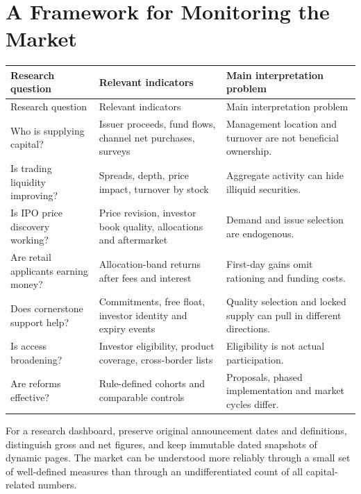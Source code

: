 \documentclass[11pt,a4paper]{article}
\begin{document}
\section{A Framework for Monitoring the Market}
\begin{longtable}{@{}L{3.3cm}L{6.2cm}L{6.0cm}@{}}
\toprule Research question & Relevant indicators & Main interpretation problem\\\midrule\endfirsthead
\toprule Research question & Relevant indicators & Main interpretation problem\\\midrule\endhead
Who is supplying capital? & Issuer proceeds, fund flows, channel net purchases, surveys & Management location and turnover are not beneficial ownership.\\
Is trading liquidity improving? & Spreads, depth, price impact, turnover by stock & Aggregate activity can hide illiquid securities.\\
Is IPO price discovery working? & Price revision, investor book quality, allocations and aftermarket & Demand and issue selection are endogenous.\\
Are retail applicants earning money? & Allocation-band returns after fees and interest & First-day gains omit rationing and funding costs.\\
Does cornerstone support help? & Commitments, free float, investor identity and expiry events & Quality selection and locked supply can pull in different directions.\\
Is access broadening? & Investor eligibility, product coverage, cross-border lists & Eligibility is not actual participation.\\
Are reforms effective? & Rule-defined cohorts and comparable controls & Proposals, phased implementation and market cycles differ.\\
\bottomrule
\end{longtable}
For a research dashboard, preserve original announcement dates and definitions, distinguish gross and net figures, and keep immutable dated snapshots of dynamic pages. The market can be understood more reliably through a small set of well-defined measures than through an undifferentiated count of all capital-related numbers.

\appendix
\end{document}
